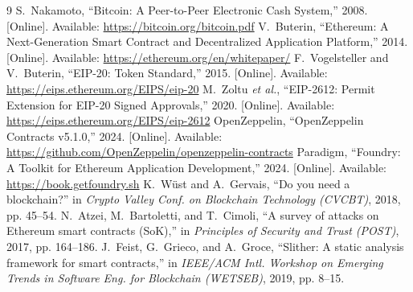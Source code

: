 \begin{thebibliography}{9}
 S.~Nakamoto, ``Bitcoin: A Peer-to-Peer Electronic Cash System,'' 2008. [Online]. Available: \url{https://bitcoin.org/bitcoin.pdf}
 V.~Buterin, ``Ethereum: A Next-Generation Smart Contract and Decentralized Application Platform,'' 2014. [Online]. Available: \url{https://ethereum.org/en/whitepaper/}
 F.~Vogelsteller and V.~Buterin, ``EIP-20: Token Standard,'' 2015. [Online]. Available: \url{https://eips.ethereum.org/EIPS/eip-20}
 M.~Zoltu \emph{et al.}, ``EIP-2612: Permit Extension for EIP-20 Signed Approvals,'' 2020. [Online]. Available: \url{https://eips.ethereum.org/EIPS/eip-2612}
 OpenZeppelin, ``OpenZeppelin Contracts v5.1.0,'' 2024. [Online]. Available: \url{https://github.com/OpenZeppelin/openzeppelin-contracts}
 Paradigm, ``Foundry: A Toolkit for Ethereum Application Development,'' 2024. [Online]. Available: \url{https://book.getfoundry.sh}
 K.~W\"ust and A.~Gervais, ``Do you need a blockchain?'' in \emph{Crypto Valley Conf. on Blockchain Technology (CVCBT)}, 2018, pp. 45--54.
 N.~Atzei, M.~Bartoletti, and T.~Cimoli, ``A survey of attacks on Ethereum smart contracts (SoK),'' in \emph{Principles of Security and Trust (POST)}, 2017, pp. 164--186.
 J.~Feist, G.~Grieco, and A.~Groce, ``Slither: A static analysis framework for smart contracts,'' in \emph{IEEE/ACM Intl. Workshop on Emerging Trends in Software Eng. for Blockchain (WETSEB)}, 2019, pp. 8--15.
\end{thebibliography}
